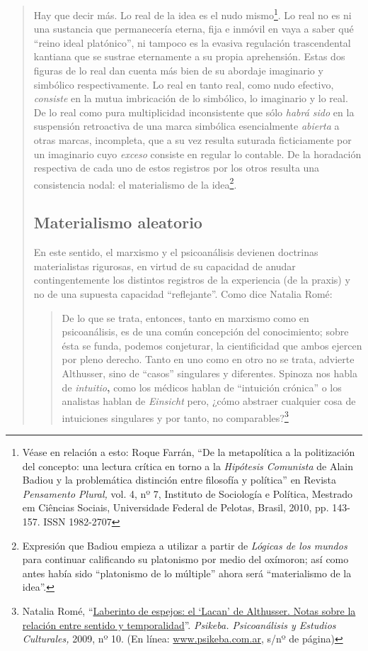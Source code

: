 \begin{quote}
Hay que decir más. Lo real de la idea es el nudo mismo\footnote{Véase en relación a esto: Roque Farrán, \enquote{De la metapolítica a la politización del concepto: una lectura crítica en torno a la \emph{Hipótesis Comunista} de Alain Badiou y la problemática distinción entre filosofía y política} en Revista \emph{Pensamento Plural,} vol. 4, nº 7, Instituto de Sociología e Política, Mestrado em Ciências Sociais, Universidade Federal de Pelotas, Brasil, 2010, pp. 143-157. ISSN 1982-2707}. Lo real no es ni una sustancia que permanecería eterna, fija e inmóvil en vaya a saber qué \enquote{reino ideal platónico}, ni tampoco es la evasiva regulación trascendental kantiana que se sustrae eternamente a su propia aprehensión. Estas dos figuras de lo real dan cuenta más bien de su abordaje imaginario y simbólico respectivamente. Lo real en tanto real, como nudo efectivo, \emph{consiste} en la mutua imbricación de lo simbólico, lo imaginario y lo real. De lo real como pura multiplicidad inconsistente que sólo \emph{habrá sido} en la suspensión retroactiva de una marca simbólica esencialmente \emph{abierta} a otras marcas, incompleta, que a su vez resulta suturada ficticiamente por un imaginario cuyo \emph{exceso} consiste en regular lo contable. De la horadación respectiva de cada uno de estos registros por los otros resulta una consistencia nodal: el materialismo de la idea\footnote{Expresión que Badiou empieza a utilizar a partir de \emph{Lógicas de los mundos} para continuar calificando su platonismo por medio del oxímoron; así como antes había sido \enquote{platonismo de lo múltiple} ahora será \enquote{materialismo de la idea}.}.

\subsection{Materialismo aleatorio}

En este sentido, el marxismo y el psicoanálisis devienen doctrinas materialistas rigurosas, en virtud de su capacidad de anudar contingentemente los distintos registros de la experiencia (de la praxis) y no de una supuesta capacidad \enquote{reflejante}. Como dice Natalia Romé:

\begin{quote}
De lo que se trata, entonces, tanto en marxismo como en psicoanálisis, es de una común concepción del conocimiento; sobre ésta se funda, podemos conjeturar, la cientificidad que ambos ejercen por pleno derecho. Tanto en uno como en otro no se trata, advierte Althusser, sino de \enquote{casos} singulares y diferentes. Spinoza nos habla de \emph{intuitio}\textbf{,} como los médicos hablan de \enquote{intuición crónica} o los analistas hablan de \emph{Einsicht} pero, ¿cómo abstraer cualquier cosa de intuiciones singulares y por tanto, no comparables?\footnote{Natalia Romé, \enquote{\href{http://www.psikeba.com.ar/articulos2/NR_el_Lacan_de_Althusser.htm}{Laberinto de espejos: el \enquote{Lacan} de Althusser. Notas sobre la relación entre sentido y temporalidad}}. \emph{Psikeba. Psicoanálisis y Estudios Culturales,} 2009, nº 10. (En línea: \href{http://www.psikeba.com.ar/}{www.psikeba.com.ar}, s/nº de página)}
\end{quote}


\end{quote}
